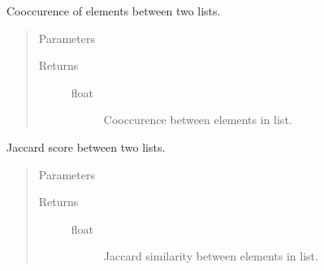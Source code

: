 \documentclass[letterpaper,10pt,english]{sphinxmanual}
\begin{document}
\begin{fulllineitems}
\label{\detokenize{index:methylnet.interpretation_classes.cooccurrence_fn}}
Cooccurence of elements between two lists.
\begin{quote}\begin{description}
\item[{Parameters}] \leavevmode\begin{description}
\item[{}] \leavevmode
\item[{}] \leavevmode
\end{description}

\item[{Returns}] \leavevmode\begin{description}
\item[{float}] \leavevmode
Cooccurence between elements in list.

\end{description}

\end{description}\end{quote}

\end{fulllineitems}


\begin{fulllineitems}
\label{\detokenize{index:methylnet.interpretation_classes.jaccard_similarity}}
Jaccard score between two lists.
\begin{quote}\begin{description}
\item[{Parameters}] \leavevmode\begin{description}
\item[{}] \leavevmode
\item[{}] \leavevmode
\end{description}

\item[{Returns}] \leavevmode\begin{description}
\item[{float}] \leavevmode
Jaccard similarity between elements in list.

\end{description}

\end{description}\end{quote}

\end{fulllineitems}
\end{document}
